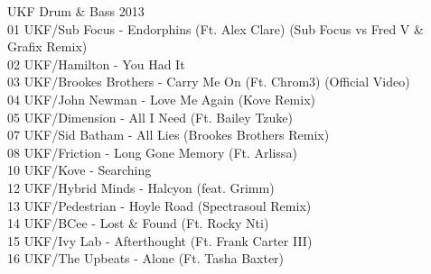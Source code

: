\begin{multicols}{2}
 \large UKF Drum \& Bass 2013 \normalsize\\
 01 UKF/Sub Focus - Endorphins (Ft. Alex Clare) (Sub Focus vs Fred V \& Grafix Remix)\\ 02 UKF/Hamilton - You Had It\\ 03 UKF/Brookes Brothers - Carry Me On (Ft. Chrom3) (Official Video)\\ 04 UKF/John Newman -  Love Me Again (Kove Remix)\\ 05 UKF/Dimension - All I Need (Ft. Bailey Tzuke)\\ 07 UKF/Sid Batham - All Lies (Brookes Brothers Remix)\\ 08 UKF/Friction - Long Gone Memory (Ft. Arlissa)\\ 10 UKF/Kove - Searching\\ 12 UKF/Hybrid Minds - Halcyon (feat. Grimm)\\ 13 UKF/Pedestrian - Hoyle Road (Spectrasoul Remix)\\ 14 UKF/BCee - Lost \& Found (Ft. Rocky Nti)\\ 15 UKF/Ivy Lab - Afterthought (Ft. Frank Carter III)\\ 16 UKF/The Upbeats - Alone (Ft. Tasha Baxter)\\
\\

\end{multicols}
